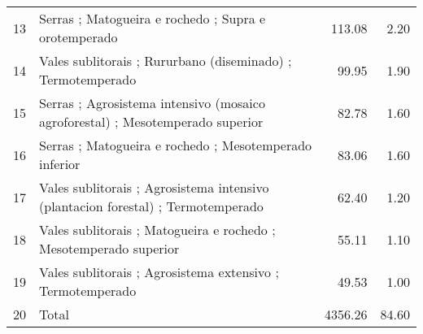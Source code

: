 \begin{table}[p]
\begin{tabular}{rlrr}
  13 & Serras ; Matogueira e rochedo ; Supra e orotemperado & 113.08 & 2.20 \\ 
  14 & Vales sublitorais ; Rururbano (diseminado) ; Termotemperado & 99.95 & 1.90 \\ 
  15 & Serras ; Agrosistema intensivo (mosaico agroforestal) ; Mesotemperado superior & 82.78 & 1.60 \\ 
  16 & Serras ; Matogueira e rochedo ; Mesotemperado inferior & 83.06 & 1.60 \\ 
  17 & Vales sublitorais ; Agrosistema intensivo (plantacion forestal) ; Termotemperado & 62.40 & 1.20 \\ 
  18 & Vales sublitorais ; Matogueira e rochedo ; Mesotemperado superior & 55.11 & 1.10 \\ 
  19 & Vales sublitorais ; Agrosistema extensivo ; Termotemperado & 49.53 & 1.00 \\ 
  20 & Total & 4356.26 & 84.60 \\ 
   \hline
\end{tabular}
\end{table}
